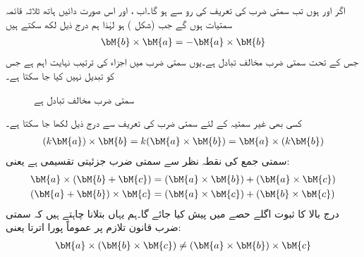 اگر اور  ہوں تب سمتی ضرب کی تعریف کی رو سے   ہو گا۔اب  ،  اور  اس صورت دائیں ہاتھ ثلاثہ قائمہ سمتیات ہوں گے جب  (شکل ) ہو لہٰذا ہم درج ذیل لکھ سکتے ہیں
\begin{align}
\bM{b} \times \bM{a}=-\bM{a}\times \bM{b}
\end{align}
جس کے تحت سمتی ضرب مخالف تبادل ہے۔یوں سمتی ضرب میں اجزاء کی ترتیب نہایت اہم ہے جس کو تبدیل نہیں کیا جا سکتا ہے۔
\begin{figure}
\centering
{}
\caption{سمتی ضرب مخالف تبادل ہے}
\label{شکل_الجبرا_مخالف_تبادل_سمتی_ضرب}
\end{figure}

کسی بھی غیر سمتیہ  کے لئے سمتی ضرب کی تعریف سے درج ذیل لکھا جا سکتا ہے۔
\begin{align}
(k\bM{a})\times \bM{b}=k(\bM{a}\times \bM{b})=\bM{a}\times(k\bM{b})
\end{align}
سمتی جمع کی نقطہ نظر سے سمتی ضرب جزئیتی تقسیمی ہے یعنی:
\begin{gather}
\begin{aligned}\label{مساوت_الجبرا_جزئیتی_تقسیم_برائے_سمتی_ضرب}
\bM{a}\times (\bM{b}+\bM{c})&=(\bM{a}\times \bM{b})+(\bM{a}\times \bM{c})\\
(\bM{a}+\bM{b})\times \bM{c}&=(\bM{a}\times \bM{c})+(\bM{b}\times \bM{c})
\end{aligned}
\end{gather}
درج بالا کا ثبوت اگلے حصے میں پیش کیا جائے گا۔ہم یہاں بتلانا چاہتے ہیں کہ سمتی ضرب قانون تلازم  پر عموماً پورا  اترتا یعنی:
\begin{align*}
\bM{a}\times (\bM{b}\times \bM{c}) \ne (\bM{a}\times \bM{b})\times \bM{c}
\end{align*}

